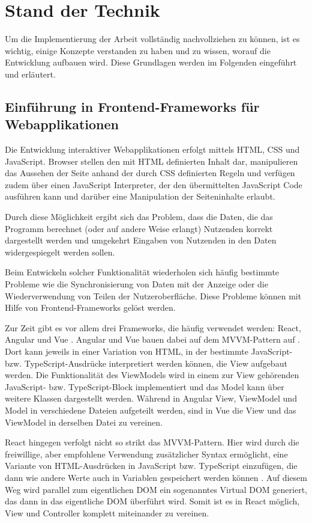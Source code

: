 \section{Stand der Technik}
Um die Implementierung der Arbeit vollständig nachvollziehen zu können, ist es wichtig, einige Konzepte verstanden zu haben und zu wissen, worauf die Entwicklung aufbauen wird. Diese Grundlagen werden im Folgenden eingeführt und erläutert.

\subsection{Einführung in Frontend-Frameworks für Webapplikationen}
Die Entwicklung interaktiver Webapplikationen erfolgt mittels HTML, CSS und JavaScript. Browser stellen den mit HTML definierten Inhalt dar, manipulieren das Aussehen der Seite anhand der durch CSS definierten Regeln und verfügen zudem über einen JavaScript Interpreter, der den übermittelten JavaScript Code ausführen kann und darüber eine Manipulation der Seiteninhalte erlaubt.

Durch diese Möglichkeit ergibt sich das Problem, dass die Daten, die das Programm berechnet (oder auf andere Weise erlangt) Nutzenden korrekt dargestellt werden und umgekehrt Eingaben von Nutzenden in den Daten widergespiegelt werden sollen.

Beim Entwickeln solcher Funktionalität wiederholen sich häufig bestimmte Probleme wie die Synchronisierung von Daten mit der Anzeige oder die Wiederverwendung von Teilen der Nutzeroberfläche. Diese Probleme können mit Hilfe von Frontend-Frameworks gelöst werden.

Zur Zeit gibt es vor allem drei Frameworks, die häufig verwendet werden: React, Angular und Vue \cite{stateofjs}. Angular und Vue bauen dabei auf dem \gls{MVVM}-Pattern auf \cite{angular_mvvm}. Dort kann jeweils in einer Variation von HTML, in der bestimmte JavaScript- bzw. TypeScript-Ausdrücke interpretiert werden können, die View aufgebaut werden. Die Funktionalität des ViewModels wird in einem zur View gehörenden JavaScript- bzw. TypeScript-Block implementiert und das Model kann über weitere Klassen dargestellt werden. Während in Angular View, ViewModel und Model in verschiedene Dateien aufgeteilt werden, sind in Vue die View und das ViewModel in derselben Datei zu vereinen.

React hingegen verfolgt nicht so strikt das \gls{MVVM}-Pattern. Hier wird durch die freiwillige, aber empfohlene Verwendung zusätzlicher Syntax ermöglicht, eine Variante von HTML-Ausdrücken in JavaScript bzw. TypeScript einzufügen, die dann wie andere Werte auch in Variablen gespeichert werden können \cite{react_jsx}. Auf diesem Weg wird parallel zum eigentlichen \gls{DOM} ein sogenanntes Virtual DOM generiert, das dann in das eigentliche \gls{DOM} überführt wird. Somit ist es in React möglich, View und Controller komplett miteinander zu vereinen.

